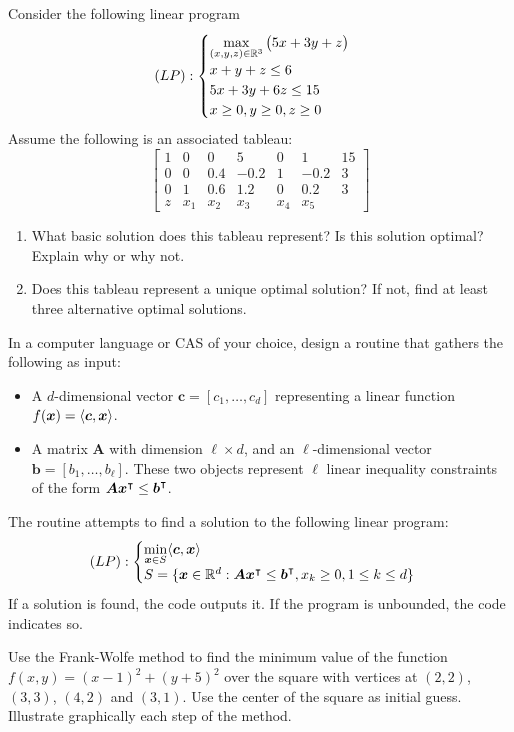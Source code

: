 \begin{problem}[Intermediate]
Consider the following linear program
\begin{equation*}
(LP): \begin{cases}
\displaystyle{\max_{(x,y,z) \in \mathbb{R}^3} \big( 5x+3y+z \big)} \\
x+y+z \leq 6 \\
5x+3y+6z \leq 15 \\
x \geq 0, y \geq 0, z \geq 0
\end{cases}
\end{equation*}
Assume the following is an associated tableau:
\begin{equation*}
\begin{bmatrix}
1 &   0 &   0 &    5 &   0 &   1  & 15 \\
0 &   0 & 0.4 & -0.2 &   1 & -0.2 &  3 \\
0 &   1 & 0.6 &  1.2 &   0 &  0.2 &  3 \\ \hline
z & x_1 & x_2 &  x_3 & x_4 &  x_5  
\end{bmatrix}
\end{equation*}
\begin{enumerate}
\item What basic solution does this tableau represent? Is this solution optimal? Explain why or why not.
\item Does this tableau represent a unique optimal solution? If not, find at least three alternative optimal solutions.
\end{enumerate}
\end{problem}

\begin{problem}[CAS]
In a computer language or CAS of your choice, design a routine that gathers the following as input:
\begin{itemize}
	\item A $d$-dimensional vector $\boldsymbol{c}=[c_1, \dotsc, c_d]$ representing a linear function $f(\boldsymbol{x}) = \langle \boldsymbol{c}, \boldsymbol{x} \rangle$.
	\item A matrix $\boldsymbol{A}$ with dimension $\ell \times d$, and an $\ell$-dimensional vector $\boldsymbol{b} = [b_1, \dotsc, b_\ell]$.  These two objects represent $\ell$ linear inequality constraints of the form $\boldsymbol{A}{\boldsymbol{x}}^\intercal \leq {\boldsymbol{b}}^\intercal$. 
\end{itemize}
The routine attempts to find a solution to the following linear program:
\begin{equation*}  
(LP): \begin{cases} \displaystyle{\min_{\boldsymbol{x}\in S} \langle \boldsymbol{c}, \boldsymbol{x}\rangle} \\ S = \{ \boldsymbol{x} \in \mathbb{R}^d : \boldsymbol{A}{\boldsymbol{x}}^\intercal \leq {\boldsymbol{b}}^\intercal, x_k \geq 0, 1 \leq k \leq d \} \end{cases}
\end{equation*}
If a solution is found, the code outputs it.  If the program is unbounded, the code indicates so.  
\end{problem}

\begin{problem}[Basic]
Use the Frank-Wolfe method to find the minimum value of the function $f(x,y)=(x-1)^2+(y+5)^2$ over the square with vertices at $(2,2)$, $(3,3)$, $(4,2)$ and $(3,1)$. Use the center of the square as initial guess.  Illustrate graphically each step of the method.
\end{problem}